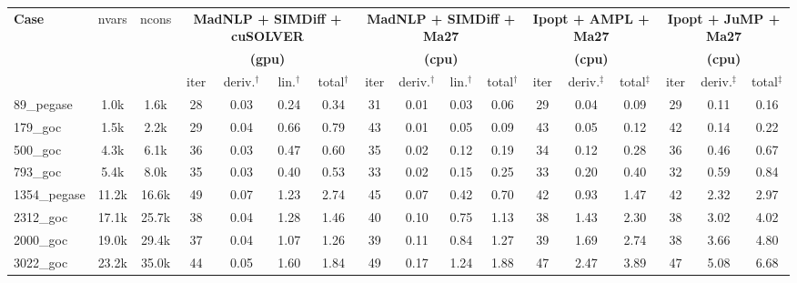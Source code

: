 \documentclass{standalone}
\begin{document}
\centering
\begin{tabular}{|l|c|c|cccc|cccc|ccc|ccc|}
  \hline
  \multirow{3}{*}{\textbf{Case}}
  & \multirow{3}{*}{nvars}
  & \multirow{3}{*}{ncons}
  & \multicolumn{4}{c|}{\textbf{MadNLP + SIMDiff + cuSOLVER}}
  & \multicolumn{4}{c|}{\textbf{MadNLP + SIMDiff + Ma27}}
  & \multicolumn{3}{c|}{\textbf{Ipopt + AMPL + Ma27}}
  & \multicolumn{3}{c|}{\textbf{Ipopt + JuMP + Ma27}}\\
  & & &\multicolumn{4}{c|}{\textbf{(gpu)}} &\multicolumn{4}{c|}{\textbf{(cpu)}} &\multicolumn{3}{c|}{\textbf{(cpu)}}&\multicolumn{3}{c|}{\textbf{(cpu)}}
  \\
  \cline{4-17}
  & & 
  & iter & deriv.$^\dag$ & lin.$^\dag$ & total$^\dag$
  & iter & deriv.$^\dag$ & lin.$^\dag$ & total$^\dag$
  & iter & deriv.$^\ddag$ & total$^\ddag$
  & iter & deriv.$^\ddag$ & total$^\ddag$
  \\
  \hline
89\_pegase 
&   1.0k
&   1.6k
& 28 
&  0.03
&  0.24
&  0.34
& 31 
&  0.01
&  0.03
&  0.06
& 29 
&  0.04
&  0.09
& 29 
&  0.11
&  0.16
\\

179\_goc 
&   1.5k
&   2.2k
& 29 
&  0.04
&  0.66
&  0.79
& 43 
&  0.01
&  0.05
&  0.09
& 43 
&  0.05
&  0.12
& 42 
&  0.14
&  0.22
\\

500\_goc 
&   4.3k
&   6.1k
& 36 
&  0.03
&  0.47
&  0.60
& 35 
&  0.02
&  0.12
&  0.19
& 34 
&  0.12
&  0.28
& 36 
&  0.46
&  0.67
\\

793\_goc 
&   5.4k
&   8.0k
& 35 
&  0.03
&  0.40
&  0.53
& 33 
&  0.02
&  0.15
&  0.25
& 33 
&  0.20
&  0.40
& 32 
&  0.59
&  0.84
\\

1354\_pegase 
&  11.2k
&  16.6k
& 49 
&  0.07
&  1.23
&  2.74
& 45 
&  0.07
&  0.42
&  0.70
& 42 
&  0.93
&  1.47
& 42 
&  2.32
&  2.97
\\
\hline
2312\_goc 
&  17.1k
&  25.7k
& 38 
&  0.04
&  1.28
&  1.46
& 40 
&  0.10
&  0.75
&  1.13
& 38 
&  1.43
&  2.30
& 38 
&  3.02
&  4.02
\\

2000\_goc 
&  19.0k
&  29.4k
& 37 
&  0.04
&  1.07
&  1.26
& 39 
&  0.11
&  0.84
&  1.27
& 39 
&  1.69
&  2.74
& 38 
&  3.66
&  4.80
\\

3022\_goc 
&  23.2k
&  35.0k
& 44 
&  0.05
&  1.60
&  1.84
& 49 
&  0.17
&  1.24
&  1.88
& 47 
&  2.47
&  3.89
& 47 
&  5.08
&  6.68
\\


\end{tabular}
\end{document}
